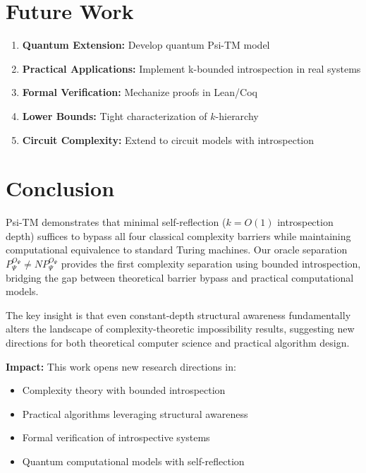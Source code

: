 \documentclass[11pt]{article}
\begin{document}
\section{Future Work}

\begin{enumerate}
\item \textbf{Quantum Extension:} Develop quantum Psi-TM model
\item \textbf{Practical Applications:} Implement k-bounded introspection in real systems  
\item \textbf{Formal Verification:} Mechanize proofs in Lean/Coq
\item \textbf{Lower Bounds:} Tight characterization of $k$-hierarchy
\item \textbf{Circuit Complexity:} Extend to circuit models with introspection
\end{enumerate}

\section{Conclusion}

Psi-TM demonstrates that minimal self-reflection ($k = O(1)$ introspection depth) suffices to bypass all four classical complexity barriers while maintaining computational equivalence to standard Turing machines. Our oracle separation $P^{O_\Psi}_\Psi \neq NP^{O_\Psi}_\Psi$ provides the first complexity separation using bounded introspection, bridging the gap between theoretical barrier bypass and practical computational models.

The key insight is that even constant-depth structural awareness fundamentally alters the landscape of complexity-theoretic impossibility results, suggesting new directions for both theoretical computer science and practical algorithm design.

\textbf{Impact:} This work opens new research directions in:
\begin{itemize}
\item Complexity theory with bounded introspection
\item Practical algorithms leveraging structural awareness
\item Formal verification of introspective systems
\item Quantum computational models with self-reflection
\end{itemize}
\end{document}
